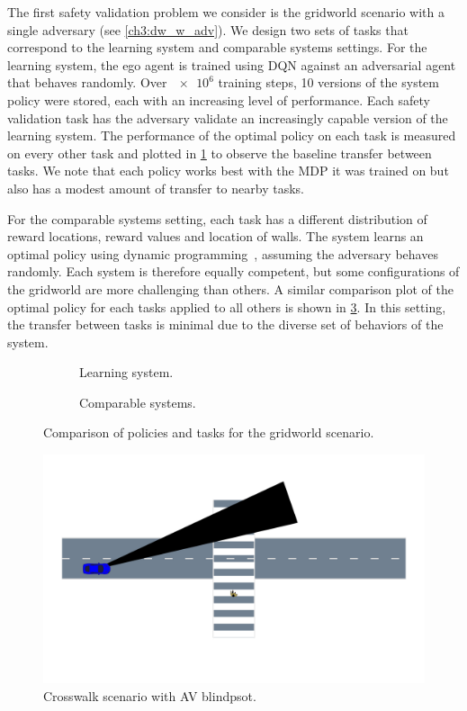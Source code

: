 The first safety validation problem we consider is the gridworld scenario with a single adversary (see \cref{ch3:dw_w_adv}). We design two sets of tasks that correspond to the learning system and comparable systems settings. For the learning system, the ego agent is trained using DQN against an adversarial agent that behaves randomly. Over $\num{e6}$ training steps, \num{10} versions of the system policy were stored, each with an increasing level of performance. Each safety validation task has the adversary validate an increasingly capable version of the learning system. The performance of the optimal policy on each task is measured on every other task and plotted in \cref{fig:ch7_comps_lgw} to observe the baseline transfer between tasks. We note that each policy works best with the MDP it was trained on but also has a modest amount of transfer to nearby tasks.

For the comparable systems setting, each task has a different distribution of reward locations, reward values and location of walls. The system learns an optimal policy using dynamic programming~\cite{dmubook}, assuming the adversary behaves randomly. Each system is therefore equally competent, but some configurations of the gridworld are more challenging than others. A similar comparison plot of the optimal policy for each tasks applied to all others is shown in \cref{fig:ch7_comps_cgw}. In this setting, the transfer between tasks is minimal due to the diverse set of behaviors of the system. 

\begin{figure}
    \centering
    \begin{subfigure}[b]{0.49\textwidth}
        \centering
        
        \caption{Learning system.}
        \label{fig:ch7_comps_lgw}
    \end{subfigure}
    \hfill
    \begin{subfigure}[b]{0.49\textwidth}
        \centering
        
        \caption{Comparable systems.}
        \label{fig:ch7_comps_cgw}
    \end{subfigure}
    \caption{Comparison of policies and tasks for the gridworld scenario.}
\end{figure}


\begin{figure}
\centering
\includegraphics[trim={0 7cm 10cm 6.5cm},clip, width=0.7\linewidth]{figures/iterative_validation/blindspot.pdf}
\caption{Crosswalk scenario with AV blindpsot. }
\label{fig:av_blindspot}
\end{figure}

